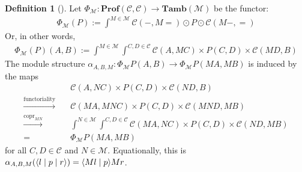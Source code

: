 \documentclass[11pt,a4paper]{article}
\theoremstyle{plain}
\theoremstyle{definition}
\newtheorem{definition}[theorem]{Definition}
\newcommand{\C}{\mathscr{C}}
\newcommand{\M}{\mathscr{M}}
\newcommand{\Pastro}{\Phi}
\newcommand{\Prof}{\mathbf{Prof}}
\newcommand{\Tamb}{\mathbf{Tamb}}
\DeclareMathOperator{\copr}{copr}
\newcommand{\rep}[2]{{\ensuremath \left\langle #1 \mid #2 \right\rangle}}
\newcommand{\repthree}[3]{{\ensuremath \langle #1 \mid #2 \mid #3 \rangle}}
\begin{document}
\begin{definition}[{\cite[Section 5]{Doubles}}]
  Let $\Pastro_\M : \Prof(\C, \C) \to \Tamb(\M)$ be the functor:
  \begin{align*}
    \Pastro_\M(P) := \int^{M \in \M}  \C(-, M{=}) \odot P \odot \C(M-, {=})
  \end{align*}
  Or, in other words,
  \begin{align*}
    \Pastro_\M(P)(A,B) := \int^{M \in \M} \int^{C,D \in \C} \C(A, MC) \times P(C,D) \times  \C(MD, B)
  \end{align*}
  The module structure $\alpha_{A,B,M} : \Pastro_\M P(A,B) \to \Pastro_\M P (MA, MB)
  $ is induced by the maps
  \begin{align*}
    &\C(A, NC) \times P(C,D) \times  \C(ND, B) \\
    \xrightarrow{\text{functoriality}} \quad& \C(MA, MNC) \times P(C,D) \times  \C(MND, MB) \\
    \xrightarrow{\copr_{MN}} \quad&\int^{N \in \M} \int^{C,D \in \C} \C(MA, NC) \times P(C,D) \times  \C(ND, MB) \\
    = \quad&\Pastro_\M P (MA, MB)
  \end{align*}
  for all $C, D \in \C$ and $N \in \M$. Equationally, this is $\alpha_{A,B,M}(\repthree{l}{p}{r} ) = \rep{Ml}{p}{Mr} $.
\end{definition}
\end{document}
